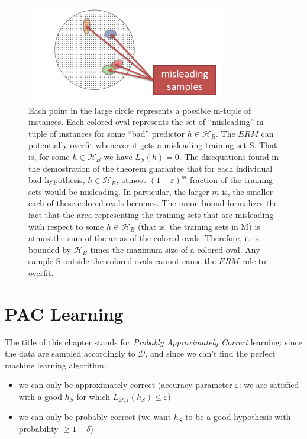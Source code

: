 \documentclass[12pt]{report}
\theoremstyle{plain}
\newcommand\mcl[1]{\mathcal{#1}}
\begin{document}
\begin{flushleft}
\begin{figure}
\centering
\includegraphics[scale=1.5]{images/misleading_samples.pdf}
\caption{Each point in the large circle represents a possible m-tuple of instances. Each colored oval represents the set of “misleading” m-tuple of instances for some “bad” predictor $h\in\mcl{H}_B$. The $ERM$ can potentially overfit whenever it gets a misleading training set S. That is, for some $h\in\mcl{H}_B$ we have $L_S(h)=0$. The disequations found in the demostration of the theorem guarantee that for each individual bad hypothesis, $h\in\mcl{H}_B$, atmost $(1-\varepsilon)^m$-fraction of the training sets would be misleading. In particular, the larger $m$ is, the smaller each of these colored ovals becomes. The union bound formalizes the fact that the area representing the training sets that are misleading with respect to some $h\in\mcl{H}_B$ (that is, the training sets in M) is atmostthe sum of the areas of the colored ovals. Therefore, it is bounded by $\mcl{H}_B$ times the maximum size of a colored oval. Any sample S outside the colored ovals cannot cause the $ERM$ rule to overfit.}
\end{figure}



\chapter{PAC Learning}

The title of this chapter stands for \textit{Probably Approximately Correct} learning: since the data are sampled accordingly to $\mcl{D}$, and since we can't find the perfect machine learning algorithm:
\begin{itemize} 
\item we can only be approximately correct (accuracy parameter $\varepsilon$: we are satisfied with a good $h_S$ for which $L_{\mcl{D},f}(h_S)\leq\varepsilon$)
\item we can only be probably correct (we want $h_S$ to be a good hypothesis with probability $\geq 1-\delta$)
\end{itemize}


\end{flushleft}
\end{document}
